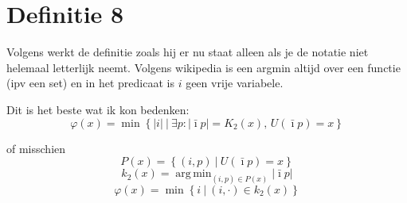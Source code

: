 \documentclass{article}
\theoremstyle{definition}
\DeclareMathOperator*{\argmin}{arg\,min}
\begin{document}
\section{Definitie 8}

Volgens werkt de definitie zoals hij er nu staat alleen als je de notatie niet helemaal letterlijk neemt. Volgens wikipedia is een argmin altijd over een functie (ipv een set) en in het predicaat is $i$ geen vrije variabele.

Dit is het beste wat ik kon bedenken:
\[
\varphi(x) = \min \left \{|i|\ |\ \exists{p} : |\bar{\imath}p| = K_2(x), \,U(\bar{\imath}p) = x\right\}
\]

of misschien
\[
P(x) = \left\{(i,p)\ |\ U(\bar{\imath}p) = x\right\}
\]
\[
k_2(x) = \argmin_{(i, p) \in P(x)} |\bar{\imath}p|
\]
\[
\varphi(x) = \min \left \{ i \ |\ (i, \cdot) \in k_2(x)\right\}
\]
\end{document}
